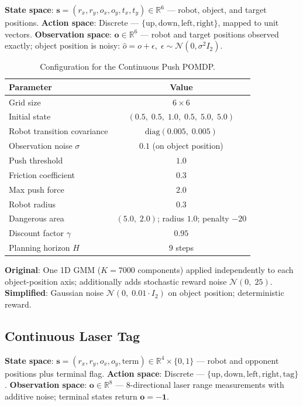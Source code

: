 \documentclass[acmlarge, manuscript, screen, review, natbib=false, oneside]{acmart}
\begin{document}
\textbf{State space}: $\mathbf{s} = (r_x, r_y, o_x, o_y, t_x, t_y) \in \mathbb{R}^6$ — robot, object, and target positions.
\textbf{Action space}: Discrete — $\{\text{up}, \text{down}, \text{left}, \text{right}\}$, mapped to unit vectors.
\textbf{Observation space}: $\mathbf{o} \in \mathbb{R}^6$ — robot and target positions observed exactly; object position is noisy: $\hat{o} = o + \epsilon,\;\epsilon \sim \mathcal{N}(0, \sigma^2 I_2)$.

\begin{table}[ht]
	\centering
	\small
	\setlength{\tabcolsep}{4pt}
	\begin{tabular}{|l|c|}
		\hline
		\textbf{Parameter} & \textbf{Value} \\
		\hline
		Grid size & $6 \times 6$ \\
		\hline
		Initial state & $(0.5,\;0.5,\;1.0,\;0.5,\;5.0,\;5.0)$ \\
		\hline
		Robot transition covariance & $\mathrm{diag}(0.005,\;0.005)$ \\
		\hline
		Observation noise $\sigma$ & $0.1$ (on object position) \\
		\hline
		Push threshold & $1.0$ \\
		\hline
		Friction coefficient & $0.3$ \\
		\hline
		Max push force & $2.0$ \\
		\hline
		Robot radius & $0.3$ \\
		\hline
		Dangerous area & $(5.0,\;2.0)$; radius $1.0$; penalty $-20$ \\
		\hline
		Discount factor $\gamma$ & $0.95$ \\
		\hline
		Planning horizon $H$ & $9$ steps \\
		\hline
	\end{tabular}
	\caption{Configuration for the Continuous Push POMDP.}
	\label{tab:push_full_config}
\end{table}

\textbf{Original}: One 1D GMM ($K = 7000$ components) applied independently to each object-position axis; additionally adds stochastic reward noise $\mathcal{N}(0,\;25)$.
\textbf{Simplified}: Gaussian noise $\mathcal{N}(0,\;0.01\cdot I_2)$ on object position; deterministic reward.

\subsection{Continuous Laser Tag}

\textbf{State space}: $\mathbf{s} = (r_x, r_y, o_x, o_y, \text{term}) \in \mathbb{R}^4 \times \{0,1\}$ — robot and opponent positions plus terminal flag.
\textbf{Action space}: Discrete — $\{\text{up}, \text{down}, \text{left}, \text{right}, \text{tag}\}$.
\textbf{Observation space}: $\mathbf{o} \in \mathbb{R}^8$ — 8-directional laser range measurements with additive noise; terminal states return $\mathbf{o} = -\mathbf{1}$.
\end{document}
